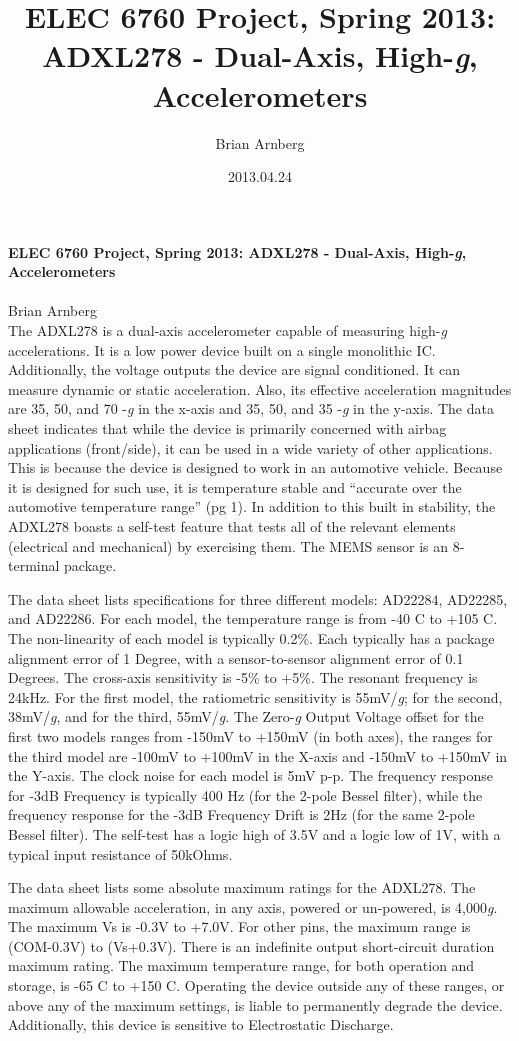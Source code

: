 \documentclass[12pt]{article}
\title{ELEC 6760 Project, Spring 2013: ADXL278 - Dual-Axis, High-\emph{g}, Accelerometers}
\date{2013.04.24}
\author{Brian Arnberg}
\begin{document}
\label{start}
\noindent\textbf{ELEC 6760 Project, Spring 2013: ADXL278 - Dual-Axis, High-\emph{g}, Accelerometers}\\
\\
Brian Arnberg\\

The ADXL278 is a dual-axis accelerometer capable of measuring high-\emph{g} accelerations. 
It is a low power device built on a single monolithic IC. Additionally, the voltage outputs 
the device are signal conditioned. It can measure dynamic or static acceleration. Also, 
its effective acceleration magnitudes are 35, 50, and 70 -\emph{g} in the x-axis and 
35, 50, and 35 -\emph{g} in the y-axis. The data sheet indicates that while the device
is primarily concerned with airbag applications (front/side), it can be used in a wide 
variety of other applications. This is because the device is designed to work in an 
automotive vehicle. Because it is designed for such use, it is temperature stable and 
``accurate over the automotive temperature range'' (pg 1). In addition to this built
in stability, the ADXL278 boasts a self-test feature that tests all of the relevant elements 
(electrical and mechanical) by exercising them. The MEMS sensor is an 8-terminal package. 

The data sheet lists specifications for three different models: AD22284, AD22285, and AD22286.  
For each model, the temperature range is from -40 C to +105 C. The non-linearity of each model
is typically 0.2\%. Each typically has a package alignment error of 1 Degree, with a 
sensor\--to\--sensor alignment error of 0.1 Degrees. The cross-axis sensitivity is -5\% to +5\%.
The resonant frequency is 24kHz. For the first model, the ratiometric sensitivity is 
55mV/\emph{g}; for the second, 38mV/\emph{g}, and for the third, 55mV/\emph{g}. 
The Zero\--\emph{g} Output Voltage offset for the first two models ranges from -150mV to +150mV 
(in both axes), the ranges for the third model are -100mV to +100mV in the X-axis and 
-150mV to +150mV in the Y-axis. The clock noise for each model is 5mV p-p. The frequency response
for -3dB Frequency is typically 400 Hz (for the 2-pole Bessel filter), while the frequency response
for the -3dB Frequency Drift is 2Hz (for the same 2-pole Bessel filter). The self-test has a 
logic high of 3.5V and a logic low of 1V, with a typical input resistance of 50kOhms. 

The data sheet lists some absolute maximum ratings for the ADXL278. The maximum allowable acceleration,
in any axis, powered or un-powered, is 4,000\emph{g}. The maximum Vs is -0.3V to +7.0V. For other pins, 
the maximum range is (COM-0.3V) to (Vs+0.3V). There is an indefinite output short-circuit duration
maximum rating. The maximum temperature range, for both operation and storage, is -65 C to +150 C. 
Operating the device outside any of these ranges, or above any of the maximum settings, is liable to 
permanently degrade the device. Additionally, this device is sensitive to Electrostatic Discharge. 
\end{document}
